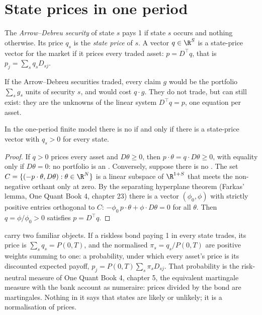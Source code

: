 \section{State prices in one period}

\begin{definition}\label{def:dv:no-arbitrage-and-the-fundamental-theorems:ad}
The \emph{Arrow--Debreu security} of state $s$
pays 1 if state $s$ occurs and nothing otherwise. Its price $q_s$ is the
\emph{state price} of $s$. A vector $q\in\R^S$ is a
state-price vector for the market if it prices every traded asset:
$p = D^\top q$, that is $p_j=\sum_s q_sD_{sj}$.
\end{definition}

If the Arrow--Debreu securities traded, every claim $g$ would be the portfolio
$\sum_s g_s$ units of security $s$, and would cost $q\cdot g$. They do not trade,
but  can still exist: they are the unknowns of the linear system
$D^\top q=p$, one equation per asset.

\begin{theorem}\label{thm:dv:no-arbitrage-and-the-fundamental-theorems:ftap1}
In the one-period finite model there is no  if and only if there is a
state-price vector with $q_s>0$ for every state.
\end{theorem}
\begin{proof}
If $q>0$ prices every asset and $D\theta\ge0$, then $p\cdot\theta=q\cdot
D\theta\ge0$, with equality only if $D\theta=0$: no portfolio is an
. Conversely, suppose there is no . The set
$C=\{(-p\cdot\theta, D\theta):\theta\in\R^N\}$ is a linear subspace of
$\R^{1+S}$ that meets the non-negative orthant only at zero. By the separating
hyperplane theorem (Farkas' lemma, One Quant Book 4, chapter 23) there is a
vector $(\phi_0,\phi)$ with strictly positive entries orthogonal to $C$:
$-\phi_0\,p\cdot\theta+\phi\cdot D\theta=0$ for all $\theta$. Then
$q=\phi/\phi_0>0$ satisfies $p=D^\top q$.
\end{proof}

 carry two familiar objects. If a riskless bond paying 1 in every
state trades, its price is $\sum_sq_s=P(0,T)$, and the normalised
$\pi_s=q_s/P(0,T)$ are positive weights summing to one: a probability, under
which every asset's price is its discounted expected payoff,
$p_j=P(0,T)\sum_s\pi_sD_{sj}$. That probability is the risk-neutral measure of
One Quant Book 4, chapter 5, the equivalent martingale measure with the bank
account as numeraire: prices divided by the bond are martingales. Nothing in it
says that states are likely or unlikely; it is a normalisation of prices.

